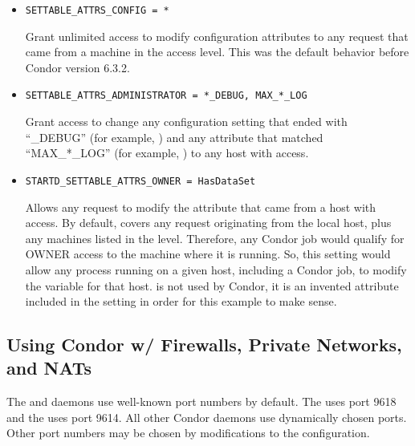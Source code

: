 \begin{itemize}

\item \begin{verbatim}SETTABLE_ATTRS_CONFIG = *\end{verbatim}
Grant unlimited access to modify configuration attributes
to any request that came from a machine in the  access
level. 
This was the default behavior before Condor version 6.3.2.

\item \begin{verbatim}SETTABLE_ATTRS_ADMINISTRATOR = *_DEBUG, MAX_*_LOG\end{verbatim} 
Grant access to change any configuration setting that ended
with ``\_DEBUG'' (for example, ) and any
attribute that matched ``MAX\_*\_LOG'' (for example,
) to any host with 
access. 

\item \begin{verbatim}STARTD_SETTABLE_ATTRS_OWNER = HasDataSet\end{verbatim}
Allows any request to modify the  
attribute that came from a host with  access.
By default,  covers any request originating from the
local host, plus any machines listed in the 
level.
Therefore, any Condor job would qualify for OWNER access to the
machine where it is running. 
So, this setting would allow any process running on a given host,
including a Condor job, to modify the  variable for
that host. 
 is not used by Condor, it is an invented attribute
included in the  setting in order for this
example to make sense.

\end{itemize}


\subsection{\label{sec:security-networks}
Using Condor w/ Firewalls, Private Networks, and NATs}


The  and  daemons
use well-known port numbers by default.
The  uses port 9618
and the  uses port 9614.
All other Condor daemons use dynamically chosen ports.
Other port numbers may be chosen by modifications to
the configuration.

